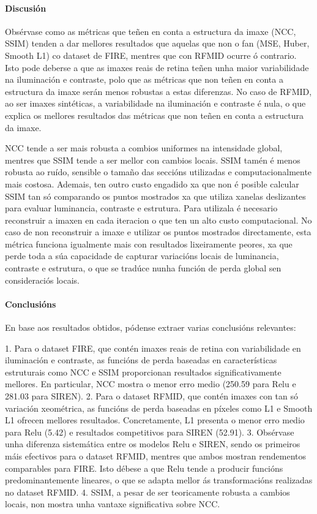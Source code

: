 \paragraph{Discusión}
\label{par:Discusion-loss}

Obsérvase como as métricas que teñen en conta a estructura da imaxe (NCC, SSIM) tenden a dar mellores resultados que aquelas que non o fan (MSE, Huber, Smooth L1) co dataset de FIRE, mentres que con RFMID ocurre ó contrario.
Isto pode deberse a que as imaxes reais de retina teñen unha maior variabilidade na iluminación e contraste, polo que as métricas que non teñen en conta a estructura da imaxe serán menos robustas a estas diferenzas.
No caso de RFMID, ao ser imaxes sintéticas, a variabilidade na iluminación e contraste é nula, o que explica os mellores resultados das métricas que non teñen en conta a estructura da imaxe.

NCC tende a ser mais robusta a combios uniformes na intensidade global, mentres que SSIM tende a ser mellor con cambios locais.
SSIM tamén é menos robusta ao ruído, sensible o tamaño das seccións utilizadas e computacionalmente mais costosa. Ademais, ten outro custo engadido xa que non é posible calcular SSIM tan só comparando os puntos mostrados xa que utiliza xanelas deslizantes para evaluar luminancia, contraste e estrutura. 
Para utilizala é necesario reconstruir a imaxen en cada iteracion o que ten un alto custo computacional.
No caso de non reconstruir a imaxe e utilizar os puntos mostrados directamente, esta métrica funciona igualmente mais con resultados lixeiramente peores, xa que perde toda a súa capacidade de capturar variacións locais de luminancia, contraste e estrutura, o que se tradúce nunha función de perda global sen consideraciós locais.

\paragraph{Conclusións}
\label{par:Conclusions-loss}

En base aos resultados obtidos, pódense extraer varias conclusións relevantes:

1. Para o dataset FIRE, que contén imaxes reais de retina con variabilidade en iluminación e contraste, as funcións de perda baseadas en características estruturais como NCC e SSIM proporcionan resultados significativamente mellores. En particular, NCC mostra o menor erro medio (250.59 para Relu e 281.03 para SIREN).
2. Para o dataset RFMID, que contén imaxes con tan só variación xeométrica, as funcións de perda baseadas en píxeles como L1 e Smooth L1 ofrecen mellores resultados. Concretamente, L1 presenta o menor erro medio para Relu (5.42) e resultados competitivos para SIREN (52.91).
3. Obsérvase unha diferenza sistemática entre os modelos Relu e SIREN, sendo os primeiros máis efectivos para o dataset RFMID, mentres que ambos mostran rendementos comparables para FIRE. Isto débese a que Relu tende a producir funcións predominantemente lineares, o que se adapta mellor ás transformacións realizadas no dataset RFMID.
4. SSIM, a pesar de ser teoricamente robusta a cambios locais, non mostra unha vantaxe significativa sobre NCC.

